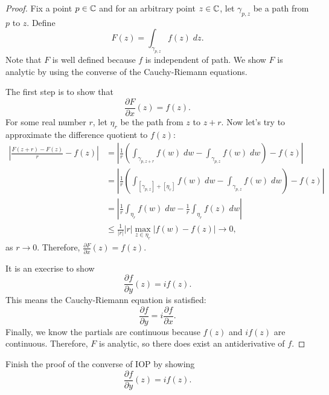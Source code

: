 \begin{proof}
    Fix a point $p \in \operatorname{\mathbb{C}}$ and for an arbitrary point $z \in \operatorname{\mathbb{C}}$,
    let $\gamma_{p, z}$ be a path from $p$ to $z$.
    Define
    \[ F(z) = \int_{\gamma_{p, z}} f(z) \; dz. \]
    Note that $F$ is well defined because $f$ is independent
    of path.
    We show $F$ is analytic by using
    the converse of the Cauchy-Riemann equations.

    \noindent
    The first step is to show that
    \[ \frac{\partial F}{\partial x}(z) = f(z). \]
    For some real number $r$,
    let $\eta_r$ be the path from $z$ to $z + r$.
    Now let's try to approximate the difference quotient
    to $f(z)$:
    \begin{align*}
        \left| \frac{F(z+r) - F(z)}{r} - f(z)\right| &= 
        \left| \frac{1}{r}\left( \int_{\gamma_{p, z+r}} f(w) \; dw - 
        \int_{\gamma_{p, z}} f(w) \; dw \right)  - f(z) \right| \\
        &= \left| \frac{1}{r}\left( \int_{[\gamma_{p, z}] + [\eta_r]} f(w) \; dw - 
        \int_{\gamma_{p, z}} f(w) \; dw \right)  - f(z) \right| \tag{Independence of Path} \\
        &= \left| \frac{1}{r} \int_{\eta_r} f(w) \; dw - 
        \frac{1}{r} \int_{\eta_r} f(z) \; dw  \right| \tag{Concatenation of Paths} \\
        &\le \frac{1}{|r|} |r| \max_{z \in \eta_r} |f(w) - f(z)|
        \to 0, \tag{ML and Continuity of $f$}
    \end{align*}
    as $r \to 0$.
    Therefore, $\frac{\partial F}{\partial x}(z) = f(z)$.

    \noindent
    It is an execrise to show
    \[ \frac{\partial f}{\partial y} (z) = if(z). \]
    This means the Cauchy-Riemann equation is satisfied:
    \[ \frac{\partial f}{\partial y} = i \frac{\partial f}{\partial x}. \]
    Finally, we know the partials are continuous because
    $f(z)$ and $if(z)$ are continuous.
    Therefore, $F$ is analytic, so there does exist an 
    antiderivative of $f$.

\end{proof}

\begin{exercise}
    Finish the proof of the converse of IOP by showing
    \[ \frac{\partial f}{\partial y} (z) = if(z). \]
\end{exercise}




